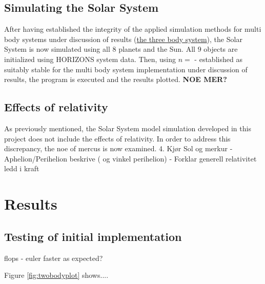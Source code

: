 \documentclass[%
oneside,                 %
final,                   %
10pt]{article}
\begin{document}
\subsection{Simulating the Solar System}
After having established the integrity of the applied simulation methods for multi body systems under discussion of results (\hyperref[subsec:Discofres:3B]{the three body system}), the Solar System is now simulated using all $8$ planets and the Sun. All $9$ objects are initialized using HORIZONS system data. Then, using $n=$ - established as suitably stable for the multi body system implementation under discussion of results, the program is executed and the results plotted. \textbf{NOE MER?}

 
\subsection{Effects of relativity}
\label{sec:M.effectsofrel}
As previously mentioned, the Solar System model simulation developed in this project does not include the effects of relativity. In order to address this discrepancy, the noe of mercus is now examined.
 4. Kjør Sol og merkur
- Aphelion/Perihelion beskrive ( og vinkel perihelion)
- Forklar generell relativitet ledd i kraft

\section{Results}
\subsection{Testing of initial implementation}
flops - euler faster as expected?

Figure \ref{fig:twobodyplot} shows....
\end{document}
